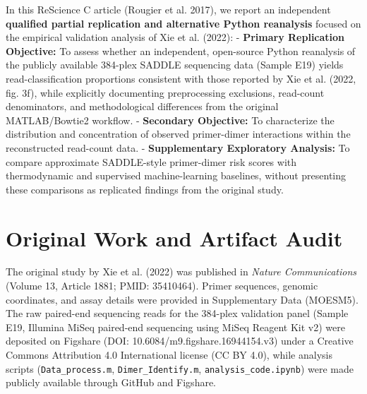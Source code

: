 \documentclass[
]{article}
\begin{document}
In this ReScience C article (Rougier et al. 2017), we report an
independent \textbf{qualified partial replication and alternative Python
reanalysis} focused on the empirical validation analysis of Xie et al.
(2022): - \textbf{Primary Replication Objective:} To assess whether an
independent, open-source Python reanalysis of the publicly available
384-plex SADDLE sequencing data (Sample E19) yields read-classification
proportions consistent with those reported by Xie et al. (2022, fig.
3f), while explicitly documenting preprocessing exclusions, read-count
denominators, and methodological differences from the original
MATLAB/Bowtie2 workflow. - \textbf{Secondary Objective:} To characterize
the distribution and concentration of observed primer-dimer interactions
within the reconstructed read-count data. - \textbf{Supplementary
Exploratory Analysis:} To compare approximate SADDLE-style primer-dimer
risk scores with thermodynamic and supervised machine-learning
baselines, without presenting these comparisons as replicated findings
from the original study.

\section{Original Work and Artifact
Audit}\label{original-work-and-artifact-audit}

The original study by Xie et al. (2022) was published in \emph{Nature
Communications} (Volume 13, Article 1881; PMID: 35410464). Primer
sequences, genomic coordinates, and assay details were provided in
Supplementary Data (MOESM5). The raw paired-end sequencing reads for the
384-plex validation panel (Sample E19, Illumina MiSeq paired-end
sequencing using MiSeq Reagent Kit v2) were deposited on Figshare (DOI:
10.6084/m9.figshare.16944154.v3) under a Creative Commons Attribution
4.0 International license (CC BY 4.0), while analysis scripts
(\texttt{Data\_process.m}, \texttt{Dimer\_Identify.m},
\texttt{analysis\_code.ipynb}) were made publicly available through
GitHub and Figshare.
\end{document}
